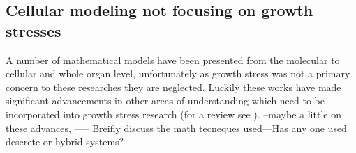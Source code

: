\subsection{Cellular modeling not focusing on growth stresses}
A number of mathematical models have been presented from the
molecular to cellular and whole organ level, unfortunately as
growth stress was not a primary concern to these researches they are neglected.
Luckily these works have made significant advancements in other areas of
understanding which need to be incorporated into growth stress research (for a review see \cite{ISI:000261731700022}). --maybe
a little on these advances, ----- Breifly discuss the math
tecneques used---Has any one used descrete or hybrid systems?---
